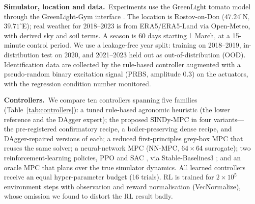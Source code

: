 \documentclass[preprint,3p]{elsarticle}
\begin{document}
\textbf{Simulator, location and data.}~Experiments use the GreenLight tomato model
\citep{katzin2020greenlight} through the GreenLight-Gym interface
\citep{vanlaatum2025greenlightgym}. The location is Rostov-on-Don ($47.24^\circ$N,
$39.71^\circ$E); real weather for 2018--2023 is from ERA5/ERA5-Land via Open-Meteo,
with derived sky and soil terms. A season is 60 days starting 1 March, at a 15-minute
control period. We use a leakage-free year split: training on 2018--2019,
in-distribution test on 2020, and 2021--2023 held out as out-of-distribution (OOD).
Identification data are collected by the rule-based controller augmented with a
pseudo-random binary excitation signal (PRBS, amplitude $0.3$) on the actuators, with
the regression condition number monitored.

\textbf{Controllers.}~We compare ten controllers spanning five families
(Table~\ref{tab:controllers}): a tuned rule-based agronomic heuristic (the lower
reference and the DAgger expert); the proposed SINDy-MPC in four variants---the
pre-registered confirmatory recipe, a boiler-preserving dense recipe, and
DAgger-repaired versions of each; a reduced first-principles grey-box MPC that reuses
the same solver; a neural-network MPC (NN-MPC, $64{\times}64$ surrogate); two
reinforcement-learning policies, PPO \citep{schulman2017ppo} and SAC
\citep{haarnoja2018sac}, via Stable-Baselines3 \citep{raffin2021sb3}; and an oracle
MPC that plans over the true simulator dynamics. All learned controllers receive an
equal hyper-parameter budget (16 trials). RL is trained for $2\times10^5$ environment
steps with observation and reward normalisation (VecNormalize), whose omission we
found to distort the RL result badly.
\end{document}
